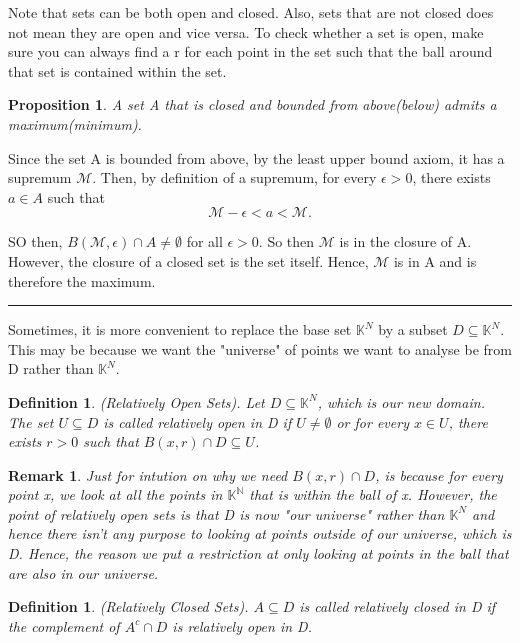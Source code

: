 \documentclass[twoside]{article}
\newtheorem{proposition}[theorem]{Proposition}
\newtheorem{remark}[theorem]{Remark}
\newtheorem{definition}[theorem]{Definition}
\newenvironment{proof}{{\bf Proof:}}{\hfill\rule{2mm}{2mm}}
\begin{document}
Note that sets can be both open and closed. Also, sets that are not closed does not mean they are open and vice versa. To check whether a set is open, make sure you can always find a r for each point in the set such that the ball around that set is contained within the set.


\begin{proposition} A set A that is closed and bounded from above(below) admits a maximum(minimum).
\end{proposition}

\begin{proof} Since the set A is bounded from above, by the least upper bound axiom, it has a supremum $\mathcal{M}$. Then, by definition of a supremum, for every $\epsilon > 0$, there exists $a \in A$ such that
$$
\mathcal{M} - \epsilon < a < \mathcal{M}.
$$

SO then, $B(\mathcal{M}, \epsilon) \cap A \neq \emptyset$ for all $\epsilon > 0$. So then $\mathcal{M}$ is in the closure of A. However, the closure of a closed set is the set itself. Hence, $\mathcal{M}$ is in A and is therefore the maximum.
\end{proof}


Sometimes, it is more convenient to replace the base set $\mathbb{K}^N$ by a subset $D \subseteq \mathbb{K}^N$. This may be because we want the "universe" of points we want to analyse be from D rather than $\mathbb{K}^N$.

\begin{definition}(Relatively Open Sets). Let $D \subseteq \mathbb{K}^N$, which is our new domain. The set $U \subseteq D$ is called relatively open in D if $U \neq \emptyset$ or for every $x \in U$, there exists $r > 0$ such that $B(x,r) \cap D \subseteq U$.
\end{definition}

\begin{remark}Just for intution on why we need $B(x,r) \cap D$, is because for every point x, we look at all the points in $\mathbb{K^N}$ that is within the ball of x. However, the point of relatively open sets is that D is now "our universe" rather than $\mathbb{K}^N$ and hence there isn't any purpose to looking at points outside of our universe, which is D. Hence, the reason we put a restriction at only looking at points in the ball that are also in our universe.
\end{remark}

\begin{definition}(Relatively Closed Sets). $A \subseteq D$ is called relatively closed in D if the complement of $A^c \cap D$ is relatively open in D.
\end{definition}
\end{document}
